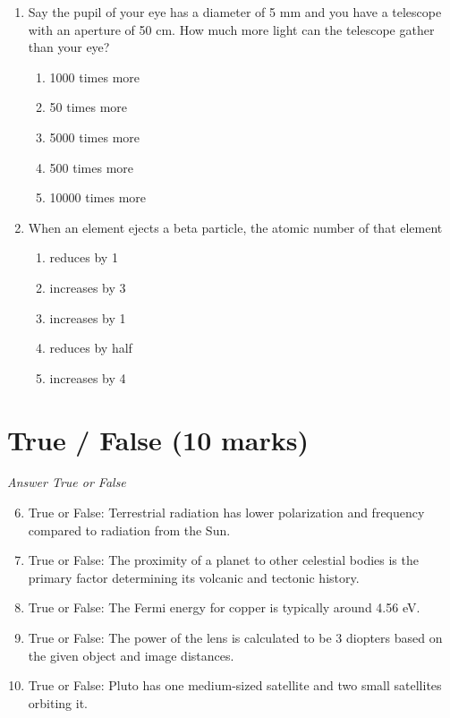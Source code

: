 \documentclass[12pt]{article}
\begin{document}
\begin{enumerate}[label=\arabic*.]
\begin{enumerate}[label=(\alph*)]
    \item Velocity, height, and acceleration
    \item Velocity and acceleration
\end{enumerate}
\item Say the pupil of your eye has a diameter of 5 mm and you have a telescope with an aperture of 50 cm. How much more light can the telescope gather than your eye?
\begin{enumerate}[label=(\alph*)]
    \item 1000 times more
    \item 50 times more
    \item 5000 times more
    \item 500 times more
    \item 10000 times more
\end{enumerate}
\item When an element ejects a beta particle, the atomic number of that element
\begin{enumerate}[label=(\alph*)]
    \item reduces by 1
    \item increases by 3
    \item increases by 1
    \item reduces by half
    \item increases by 4
\end{enumerate}
\end{enumerate}

\section*{True / False (10 marks)}
\textit{Answer True or False}
\begin{enumerate}[label=\arabic*.]
\setcounter{enumi}{5}
\item True or False: Terrestrial radiation has lower polarization and frequency compared to radiation from the Sun.
\item True or False: The proximity of a planet to other celestial bodies is the primary factor determining its volcanic and tectonic history.
\item True or False: The Fermi energy for copper is typically around 4.56 eV.
\item True or False: The power of the lens is calculated to be 3 diopters based on the given object and image distances.
\item True or False: Pluto has one medium-sized satellite and two small satellites orbiting it.
\end{enumerate}
\end{document}
